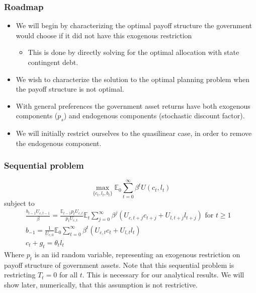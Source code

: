 \documentclass{beamer}
\newcommand{\EE}{\mathbb E}
\begin{document}
\begin{frame}
\frametitle{Roadmap}
	\begin{itemize}
		\item  We will begin by characterizing the optimal payoff structure the government would choose if it did not have this exogenous restriction
		\begin{itemize}
			\item  This is done by directly solving for the optimal allocation with state contingent debt.
		\end{itemize}
		\item We wish to characterize the solution to the optimal planning problem when the payoff structure is not optimal.
		\item  With general preferences the government asset returns have both exogenous components ($p_s$) and endogenous components (stochastic discount factor).
		\item  We will initially restrict ourselves to the quasilinear case, in order to remove the endogenous component.
	\end{itemize}
\end{frame}
 
 \begin{frame}
 \frametitle{Sequential problem}  
\[
	\max_{\{c_t,l_t,b_t\}} \EE_0\sum_{t=0}^\infty \beta^t U(c_t,l_t)
\]subject to
\begin{align*}
	\frac{b_{t-1}U_{c,t-1}}{\beta} = \frac{\EE_{t-1} p_t U_{c,t}}{p_t U_{c,t}}\EE_t\sum_{j=0}^\infty\beta^j\left( U_{c,t+j}c_{t+j}+U_{l,t+j}l_{t+j}\right)\text{  for $t\geq 1$ }\\
	b_{-1} = \frac1{U_{c,0}}\EE_0\sum_{t=0}^\infty \beta^t\left(U_{c,t}c_t+U_{l,t}l_t\right)\\
	c_t + g_t = \theta_t l_t
\end{align*}
Where $p_t$ is an iid random variable, representing an exogenous restriction on payoff structure of government assets.  Note that this sequential problem is restricting $T_t = 0$ for all $t$.  This is necessary for our analytical results.  We will show later, numerically, that this assumption is not restrictive.
  \end{frame}
  
\end{document}
